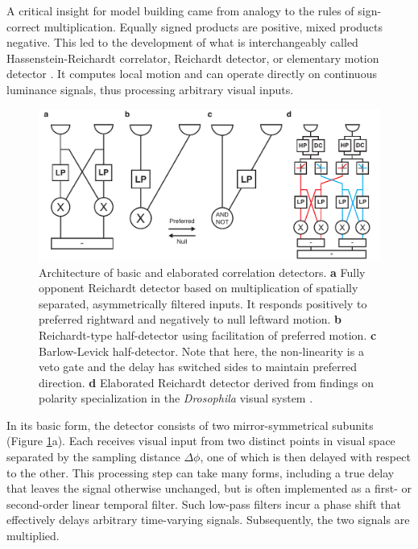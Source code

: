 A critical insight for model building came from analogy to the rules of sign-correct multiplication. Equally signed products are positive, mixed products negative. This led to the development of what is interchangeably called Hassenstein-Reichardt correlator, Reichardt detector, or elementary motion detector \citep{Reichardt:1961aa}. It computes local motion and can operate directly on continuous luminance signals, thus processing arbitrary visual inputs.

\begin{figure}
    \centering
    \includegraphics[width=1\textwidth]{graphics/figure_models1}
    \caption[Correlation-type models for motion detection]
    {Architecture of basic and elaborated correlation detectors. \textbf{a} Fully opponent Reichardt detector based on multiplication of spatially separated, asymmetrically filtered inputs. It responds positively to preferred rightward and negatively to null leftward motion. \textbf{b} Reichardt-type half-detector using facilitation of preferred motion. \textbf{c} Barlow-Levick half-detector. Note that here, the non-linearity is a veto gate and the delay has switched sides to maintain preferred direction. \textbf{d} Elaborated Reichardt detector derived from findings on polarity specialization in the \textit{Drosophila} visual system \citep{Eichner:2011ic}.}
    \label{fig:detector1}
\end{figure}


In its basic form, the detector consists of two mirror-symmetrical subunits (Figure \ref{fig:detector1}a). Each receives visual input from two distinct points in visual space separated by the sampling distance $\Delta\phi$, one of which is then delayed with respect to the other. This processing step can take many forms, including a true delay that leaves the signal otherwise unchanged, but is often implemented as a first- or second-order linear temporal filter. Such low-pass filters incur a phase shift that effectively delays arbitrary time-varying signals. Subsequently, the two signals are multiplied.


